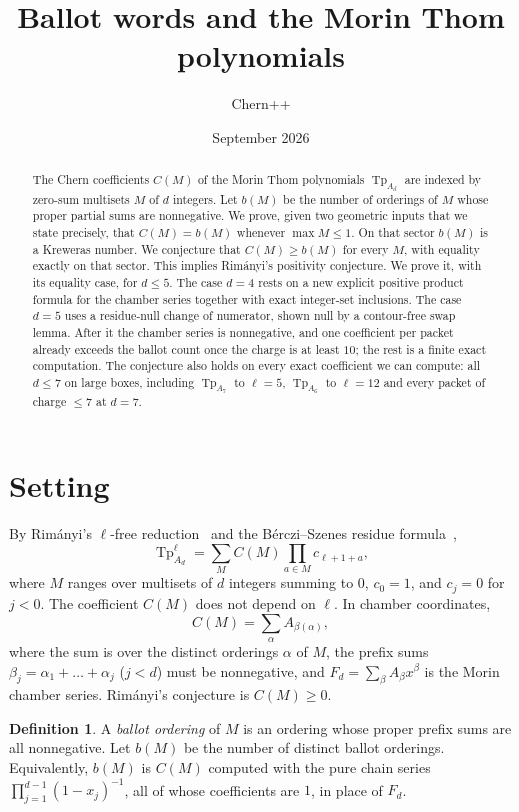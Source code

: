 \documentclass[11pt,a4paper]{article}
\title{\textbf{Ballot words and the Morin Thom polynomials}}
\author{Chern++}
\date{September 2026}
\DeclareMathOperator{\Tp}{Tp}
\theoremstyle{plain}
\theoremstyle{definition}
\newtheorem{definition}[theorem]{Definition}
\theoremstyle{remark}
\begin{document}
\maketitle

\begin{abstract}
The Chern coefficients $C(M)$ of the Morin Thom polynomials $\Tp_{A_d}$ are indexed by zero-sum
multisets $M$ of $d$ integers. Let $b(M)$ be the number of orderings of $M$ whose proper partial
sums are nonnegative. We prove, given two geometric inputs that we state precisely, that
$C(M) = b(M)$ whenever $\max M \le 1$. On that sector $b(M)$ is a Kreweras number. We conjecture that
$C(M) \ge b(M)$ for every $M$, with equality exactly on that sector. This implies Rim\'anyi's
positivity conjecture. We prove it, with its equality case, for $d \le 5$. The case $d = 4$ rests
on a new explicit positive product formula for the chamber series together with exact integer-set
inclusions. The case $d = 5$ uses a residue-null change of numerator, shown null by a contour-free
swap lemma. After it the chamber series is nonnegative, and one coefficient per packet already
exceeds the ballot count once the charge is at least $10$; the rest is a finite exact
computation. The conjecture also holds on every exact coefficient we can compute: all $d \le 7$ on large boxes, including $\Tp_{A_7}$ to $\ell = 5$, $\Tp_{A_6}$ to $\ell = 12$ and every packet of
charge $\le 7$ at $d = 7$.
\end{abstract}

\section{Setting}

By Rim\'anyi's $\ell$-free reduction~\cite{Rim01} and the B\'erczi--Szenes residue formula~\cite{BS12},
\[
  \Tp^{\ell}_{A_d} = \sum_{M} C(M) \prod_{a \in M} c_{\ell + 1 + a},
\]
where $M$ ranges over multisets of $d$ integers summing to $0$, $c_0 = 1$, and $c_j = 0$ for $j < 0$. The
coefficient $C(M)$ does not depend on $\ell$. In chamber coordinates,
\[
  C(M) = \sum_{\alpha} A_{\beta(\alpha)} ,
\]
where the sum is over the distinct orderings $\alpha$ of $M$, the prefix sums
$\beta_j = \alpha_1 + \dots + \alpha_j$ ($j < d$) must be nonnegative, and $F_d = \sum_\beta A_\beta
x^\beta$ is the Morin chamber series. Rim\'anyi's conjecture is $C(M) \ge 0$.

\begin{definition}
A \emph{ballot ordering} of $M$ is an ordering whose proper prefix sums are all nonnegative. Let
$b(M)$ be the number of distinct ballot orderings. Equivalently, $b(M)$ is $C(M)$ computed with the
pure chain series $\prod_{j=1}^{d-1}(1 - x_j)^{-1}$, all of whose coefficients are $1$, in place
of $F_d$.
\end{definition}
\end{document}
